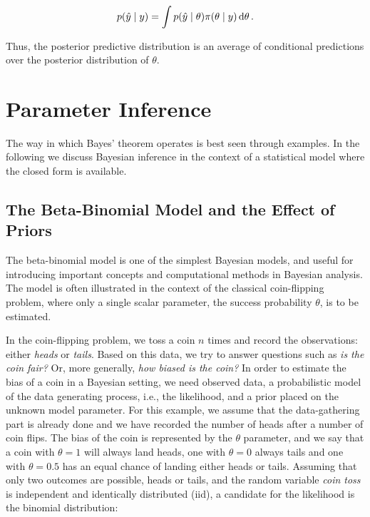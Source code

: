 \begin{equation}\label{eq:post_pred}
    p \qty( \hat{y} \mid y ) =\int p \qty(\hat{y} \mid \theta) \pi \qty(\theta \mid y) \dd{\theta}.
\end{equation} 

Thus, the posterior predictive distribution is an average of conditional predictions over the posterior distribution of $\theta$.


\section{Parameter Inference}\label{sec:param_inference}

The way in which Bayes' theorem operates is best seen through examples. In the following we discuss Bayesian inference in the context of a statistical model where the closed form is available. %

\subsection{The Beta-Binomial Model and the Effect of Priors}\label{sec:coin_flipping}

The beta-binomial model is one of the simplest Bayesian models, and useful for introducing important concepts and computational methods in Bayesian analysis. The model is often illustrated in the context of the classical coin-flipping problem, where only a single scalar parameter, the success probability $\theta$, is to be estimated. 

In the coin-flipping problem, we toss a coin $n$ times and record the observations: either \textit{heads} or \textit{tails}. Based on this data, we try to answer questions such as \textit{is the coin fair?} Or, more generally, \textit{how biased is the coin?} In order to estimate the bias of a coin in a Bayesian setting, we need observed data, a probabilistic model of the data generating process, i.e., the likelihood, and a prior placed on the unknown model parameter. For this example, we assume that the data-gathering part is already done and we have recorded the number of heads after a number of coin flips. The bias of the coin is represented by the $\theta$ parameter, and we say that a coin with $\theta=1$ will always land heads, one with $\theta=0$ always tails and one with $\theta=0.5$ has an equal chance of landing either heads or tails. Assuming that only two outcomes are possible, heads or tails, and the random variable \textit{coin toss} is independent and identically distributed (iid), a candidate for the likelihood is the binomial distribution: 

